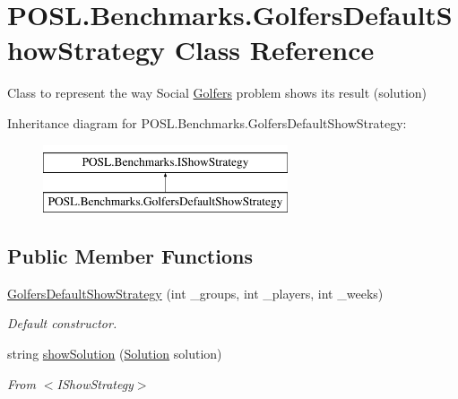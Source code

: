 \hypertarget{classPOSL_1_1Benchmarks_1_1GolfersDefaultShowStrategy}{}\section{P\+O\+S\+L.\+Benchmarks.\+Golfers\+Default\+Show\+Strategy Class Reference}
\label{classPOSL_1_1Benchmarks_1_1GolfersDefaultShowStrategy}


Class to represent the way Social \hyperlink{classPOSL_1_1Benchmarks_1_1Golfers}{Golfers} problem shows its result (solution)  


Inheritance diagram for P\+O\+S\+L.\+Benchmarks.\+Golfers\+Default\+Show\+Strategy\+:\begin{figure}[H]
\begin{center}
\leavevmode
\includegraphics[height=2.000000cm]{classPOSL_1_1Benchmarks_1_1GolfersDefaultShowStrategy}
\end{center}
\end{figure}
\subsection*{Public Member Functions}
\begin{DoxyCompactItemize}
\item 
\hyperlink{classPOSL_1_1Benchmarks_1_1GolfersDefaultShowStrategy_aabef047e1ad34907123912f9cebb35fd}{Golfers\+Default\+Show\+Strategy} (int \+\_\+groups, int \+\_\+players, int \+\_\+weeks)
\begin{DoxyCompactList}\small\item\em Default constructor. \end{DoxyCompactList}\item 
\mbox{\label{classPOSL_1_1Benchmarks_1_1GolfersDefaultShowStrategy_af4af1bde7fadcbf8e75a6b679676b0c8}} 
string \hyperlink{classPOSL_1_1Benchmarks_1_1GolfersDefaultShowStrategy_af4af1bde7fadcbf8e75a6b679676b0c8}{show\+Solution} (\hyperlink{classPOSL_1_1Data_1_1Solution}{Solution} solution)
\begin{DoxyCompactList}\small\item\em From $<$\+I\+Show\+Strategy$>$ \end{DoxyCompactList}\end{DoxyCompactItemize}


